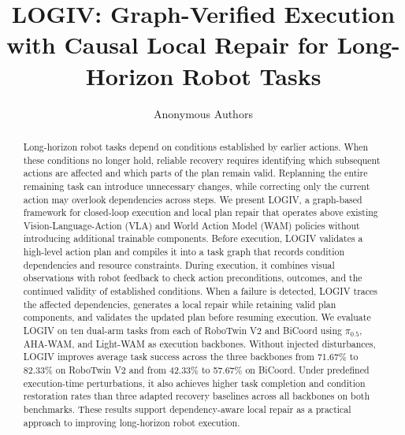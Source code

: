 \documentclass[letterpaper,10pt,conference]{ieeeconf}
\title{LOGIV: Graph-Verified Execution with Causal Local Repair for Long-Horizon Robot Tasks}
\author{Anonymous Authors}
\begin{document}
\maketitle
\thispagestyle{empty}
\pagestyle{empty}

\begin{abstract}
Long-horizon robot tasks depend on conditions established by earlier actions. When these conditions no longer hold, reliable recovery requires identifying which subsequent actions are affected and which parts of the plan remain valid. Replanning the entire remaining task can introduce unnecessary changes, while correcting only the current action may overlook dependencies across steps. We present LOGIV, a graph-based framework for closed-loop execution and local plan repair that operates above existing Vision-Language-Action (VLA) and World Action Model (WAM) policies without introducing additional trainable components. Before execution, LOGIV validates a high-level action plan and compiles it into a task graph that records condition dependencies and resource constraints. During execution, it combines visual observations with robot feedback to check action preconditions, outcomes, and the continued validity of established conditions. When a failure is detected, LOGIV traces the affected dependencies, generates a local repair while retaining valid plan components, and validates the updated plan before resuming execution. We evaluate LOGIV on ten dual-arm tasks from each of RoboTwin V2 and BiCoord using $\pi_{0.5}$, AHA-WAM, and Light-WAM as execution backbones. Without injected disturbances, LOGIV improves average task success across the three backbones from 71.67\% to 82.33\% on RoboTwin V2 and from 42.33\% to 57.67\% on BiCoord. Under predefined execution-time perturbations, it also achieves higher task completion and condition restoration rates than three adapted recovery baselines across all backbones on both benchmarks. These results support dependency-aware local repair as a practical approach to improving long-horizon robot execution.


\end{abstract}
\end{document}
